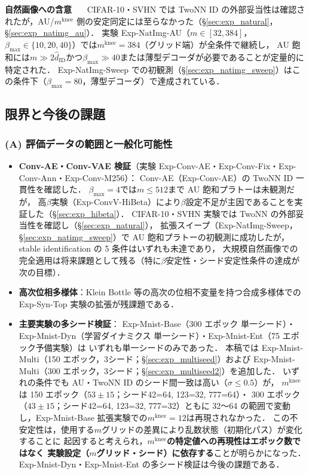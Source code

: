 \documentclass[11pt,a4paper]{jsarticle}
\newcommand{\mknee}{m^{\mathrm{knee}}}
\begin{document}
\textbf{自然画像への含意}~~~
CIFAR-10・SVHN では TwoNN ID の外部妥当性は確認されたが，AU/$\mknee$ 側の安定同定には至らなかった（§\ref{sec:exp_natural}，§\ref{sec:exp_natimg_au}）．
実験 Exp-NatImg-AU（$m \in [32, 384]$，$\beta_{\max} \in \{10,20,40\}$）では$\mknee = 384$（グリッド端）が全条件で継続し，
AU 飽和には$m \gg 2\hat{d}_\mathrm{ID}$かつ$\beta_{\max} \gg 40$または薄型デコーダが必要であることが定量的に特定された．
Exp-NatImg-Sweep での初観測（§\ref{sec:exp_natimg_sweep}）はこの条件下（$\beta_{\max}=80$，薄型デコーダ）で達成されている．

\subsection{限界と今後の課題}\label{sec:disc_limitation}

\subsubsection*{(A) 評価データの範囲と一般化可能性}

\begin{itemize}
  \item \textbf{Conv-AE・Conv-VAE 検証}（実験 Exp-Conv-AE・Exp-Conv-Fix・Exp-Conv-Ann・Exp-Conv-M256）：
        Conv-AE（Exp-Conv-AE）の TwoNN ID 一貫性を確認した．
        $\beta_{\max}=4$では$m \leq 512$まで AU 飽和プラトーは未観測だが，
        高$\beta$実験（Exp-ConvV-HiBeta）により$\beta$設定不足が主因であることを実証した（§\ref{sec:exp_hibeta}）．
        CIFAR-10・SVHN 実験では TwoNN の外部妥当性を確認し（§\ref{sec:exp_natural}），
        拡張スイープ（Exp-NatImg-Sweep，§\ref{sec:exp_natimg_sweep}）で AU 飽和プラトーの初観測に成功したが，
        stable identification の 5 条件はいずれも未達であり，
        大規模自然画像での完全適用は将来課題として残る（特に$\beta$安定性・シード安定性条件の達成が次の目標）．
  \item \textbf{高次位相多様体}：Klein Bottle 等の高次の位相不変量を持つ合成多様体での
        Exp-Syn-Top 実験の拡張が残課題である．
  \item \textbf{主要実験の多シード検証}：
        Exp-Mnist-Base（300 エポック 単一シード）・Exp-Mnist-Dyn（学習ダイナミクス 単一シード）・Exp-Mnist-Ent（75 エポック予備実験）は
        いずれも単一シードのみであった．
        本稿では Exp-Mnist-Multi（150 エポック，3シード；§\ref{sec:exp_multiseed}）および
        Exp-Mnist-Multi（300 エポック，3シード；§\ref{sec:exp_multiseed2}）を追加した．
        いずれの条件でも AU・TwoNN ID のシード間一致は高い（$\sigma \leq 0.5$）が，
        $\mknee$は 150 エポック（$53 \pm 15$；シード42=64, 123=32, 777=64）・
        300 エポック（$43 \pm 15$；シード42=64, 123=32, 777=32）ともに
        32〜64 の範囲で変動し，Exp-Mnist-Base 拡張実験での$\mknee = 12$は再現されなかった．
        この不安定性は，使用する$m$グリッドの差異により乱数状態（初期化パス）が変化することに
        起因すると考えられ，\textbf{$\mknee$の特定値への再現性はエポック数ではなく
        実験設定（$m$グリッド・シード）に依存する}ことが明らかになった．
        Exp-Mnist-Dyn・Exp-Mnist-Ent の多シード検証は今後の課題である．
\end{itemize}
\end{document}
